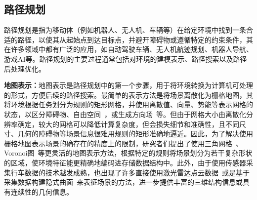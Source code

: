 \subsection{路径规划}

路径规划是指为移动体（例如机器人、无人机、车辆等）在给定环境中找到一条合适的路径，以使其从起始点到达目标点，并避开障碍物或遵循特定的约束条件，其在许多领域中都有广泛的应用，如自动驾驶车辆、无人机航迹规划、机器人导航、游戏AI等。路径规划的主要过程通常包括对环境的建模表示、路径搜索以及路径后处理优化。

\textbf{地图表示：}地图表示是路径规划中的第一个步骤，用于将环境转换为计算机可处理的形式，方便后续的路径搜索。最简单的表示方法是将场景离散化为栅格地图，其将环境根据任务划分为规则的矩形网格，并使用离散值、向量、势能等表示网格的状态，以区分障碍物、自由空间~\cite{lee2011smooth, lee2013hierarchical}，或生成方向场~\cite{sakuma2005psychological, patil2010directing}等。但由于网格大小由离散化分辨率确定，较大的网格可以降低计算复杂度，但会损失细节和准确性，且不同尺寸、几何的障碍物等场景信息很难用规则的矩形准确地逼近。因此，为了解决使用栅格地图表示场景的确存在的精度上的限制，研究者们提出了使用三角网格~\cite{lamarche2004crowd, kallmann2005path}、Voronoi图~\cite{choset1996sensor, sud2007surface, sud2008real}等更灵活的地图表示方法，根据特定的规则将场景划分为若干复杂形状的区域，使环境特征能更精确地编码进存储数据结构中。此外，由于使用传感器采集行车数据的技术越发成熟，也出现了许多直接使用激光雷达点云数据~\cite{chen2015safe}或是基于采集数据构建隐式曲面~\cite{breitenmoser2012surface}来表征场景的方法，进一步提供丰富的三维结构信息或具有连续性的几何信息。

